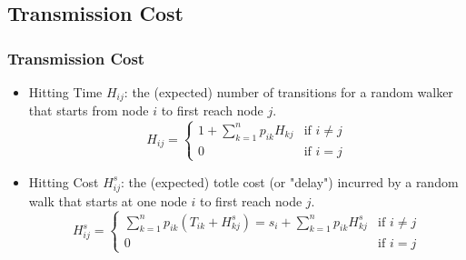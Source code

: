 \documentclass[xcolor=dvipsnames]{beamer}
\begin{document}
\subsection{Transmission Cost}
\begin{frame}
\frametitle{Transmission Cost}
\begin{itemize}
\item<1-> Hitting Time $H_{ij}$: the (expected) number of transitions for a random walker that starts from node $i$ to first reach node $j$.
\begin{equation}
H_{ij} = \left\{ \begin{array}{ll}
1+ \sum_{k=1}^{n}p_{ik}H_{kj} & \textrm{if $i\not= j$}\\
0 & \textrm{if $i=j$}
\end{array} \right.
\end{equation}
\item<2-> Hitting Cost $H_{ij}^{s}$: the (expected) totle cost (or "delay") incurred by a random walk that starts at one node $i$ to first reach node $j$.
\begin{equation}
H_{ij}^{s} = \left\{ \begin{array}{ll}
\sum_{k=1}^{n}p_{ik}(T_{ik}+H_{kj}^{s}) = s_{i}+ \sum_{k=1}^{n} p_{ik} H_{kj}^{s} & \textrm{if $i\not= j$}\\
0 & \textrm{if $i=j$}
\end{array} \right.
\end{equation}
\end{itemize}
\end{frame}
\end{document}

